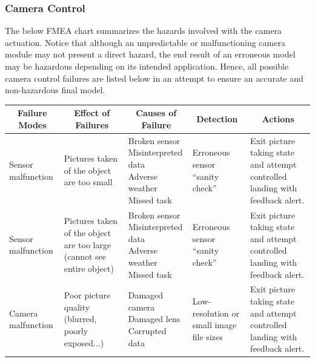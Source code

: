 \documentclass[10pt,letterpaper]{article}
\newcommand{\fmeaheader}{\multicolumn{1}{c}{\textbf{Failure Modes}} & \multicolumn{1}{c}{\textbf{Effect of Failures}} & \multicolumn{1}{c}{\textbf{Causes of Failure}} & \multicolumn{1}{c}{\textbf{Detection}} & \multicolumn{1}{c}{\textbf{Actions}}}
\begin{document}
\subsubsection{Camera Control}
The below FMEA chart summarizes the hazards involved with the camera actuation. Notice that although an unpredictable or malfunctioning camera module may not present a direct hazard, the end result of an erroneous model may be hazardous depending on its intended application. Hence, all possible camera control failures are listed below in an attempt to ensure an accurate and non-hazardous final model.
\begin{table}[H]
\footnotesize  
	\begin{adjustwidth}{-1.8in}{-1.8in}  
      \begin{center}
          \begin{tabular}{|p{3cm}p{3cm}p{3cm}p{3cm}p{3cm}|}
          \fmeaheader \\ \hline
              Sensor malfunction & 
              Pictures taken of the object are too small & 
              \parbox[t]{3cm}{Broken sensor \\ Misinterpreted data \\ Adverse weather \\ Missed task} & 
              Erroneous sensor ``sanity check'' & 
              Exit picture taking state and attempt controlled landing with feedback alert. \\ \hline  
              
              Sensor malfunction & 
              Pictures taken of the object are too large (cannot see entire object) & 
              \parbox[t]{3cm}{Broken sensor \\ Misinterpreted data \\ Adverse weather \\ Missed task} & 
              Erroneous sensor ``sanity check'' & 
              Exit picture taking state and attempt controlled landing with feedback alert. \\ \hline  
              
              Camera malfunction & 
              Poor picture quality (blurred, poorly exposed...) & 
              \parbox[t]{3cm}{Damaged camera \\ Damaged lens \\ Corrupted data} & 
              Low-resolution or small image file sizes & 
              Exit picture taking state and attempt controlled landing with feedback alert. \\ \hline  
              

\end{tabular}
\end{center}
\end{adjustwidth}
\end{table}
\end{document}
